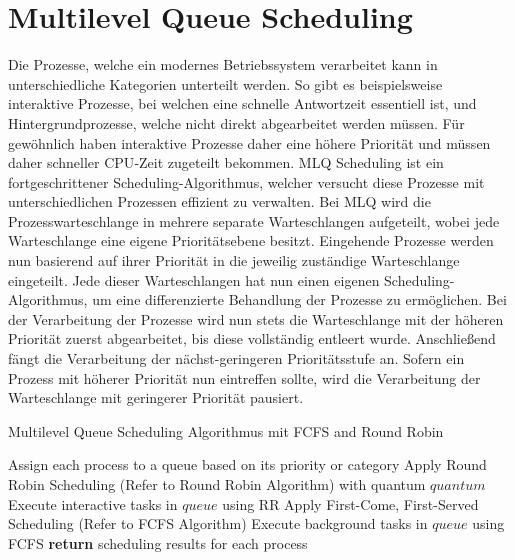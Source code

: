 \section{Multilevel Queue Scheduling}
Die Prozesse, welche ein modernes Betriebssystem verarbeitet kann in unterschiedliche Kategorien unterteilt werden. So gibt es beispielsweise interaktive Prozesse, bei welchen eine schnelle Antwortzeit essentiell ist, und Hintergrundprozesse, welche nicht direkt abgearbeitet werden müssen. Für gewöhnlich haben interaktive Prozesse daher eine höhere Priorität und müssen daher schneller \ac{CPU}-Zeit zugeteilt bekommen. \ac{MLQ} Scheduling ist ein fortgeschrittener Scheduling-Algorithmus, welcher versucht diese Prozesse mit unterschiedlichen Prozessen effizient zu verwalten. Bei \ac{MLQ} wird die Prozesswarteschlange in mehrere separate Warteschlangen aufgeteilt, wobei jede Warteschlange eine eigene Prioritätsebene besitzt. Eingehende Prozesse werden nun basierend auf ihrer Priorität in die jeweilig zuständige Warteschlange eingeteilt. Jede dieser Warteschlangen hat nun einen eigenen Scheduling-Algorithmus, um eine differenzierte Behandlung der Prozesse zu ermöglichen. %
Bei der Verarbeitung der Prozesse wird nun stets die Warteschlange mit der höheren Priorität zuerst abgearbeitet, bis diese vollständig entleert wurde. Anschließend fängt die Verarbeitung der nächst-geringeren Prioritätsstufe an. Sofern ein Prozess mit höherer Priorität nun eintreffen sollte, wird die Verarbeitung der Warteschlange mit geringerer Priorität pausiert. 

\begin{algorithm}
	\caption{Multilevel Queue Scheduling Algorithmus mit \ac{FCFS} and Round Robin}
	\label{alg:mlq}
	\begin{algorithmic}[1]
		\State Assign each process to a queue based on its priority or category
		\State Apply Round Robin Scheduling (Refer to Round Robin Algorithm) with quantum $quantum$
		\State Execute interactive tasks in $queue$ using RR
		\State Apply First-Come, First-Served Scheduling (Refer to FCFS Algorithm)
		\State Execute background tasks in $queue$ using FCFS
		\EndIf
		\EndFor
		\State \textbf{return} scheduling results for each process
		\EndProcedure
	\end{algorithmic}
\end{algorithm}

